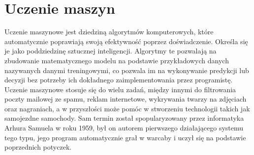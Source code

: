 \chapter{Uczenie maszyn}
Uczenie maszynowe jest dziedziną algorytmów komputerowych, które automatycznie poprawiają swoją efektywność poprzez doświadczenie. 
Określa się je jako poddziedzinę sztucznej inteligencji. Algorytmy te pozwalają na zbudowanie matematycznego modelu na podstawie 
przykładowych danych nazywanych danymi treningowymi, co pozwala im na wykonywanie predykcji lub decyzji bez potrzeby ich dokładnego 
zaimplementowania przez programistę. Uczenie maszynowe stosuje się do wielu zadań, między innymi do filtrowania poczty mailowej ze spamu, reklam internetowe, 
wykrywania twarzy na zdjęciach oraz nagraniach, a w przyszłości może pomóc w stworzeniu technologii takich jak 
samojezdne samochody. Sam termin został spopularyzowany przez informatyka Arhura Samuela w roku 1959, był on autorem pierwszego działającego 
systemu tego typu, jego program automatycznie grał w warcaby i uczył się na podstawie poprzednich potyczek. ~\cite{MLBasics}
